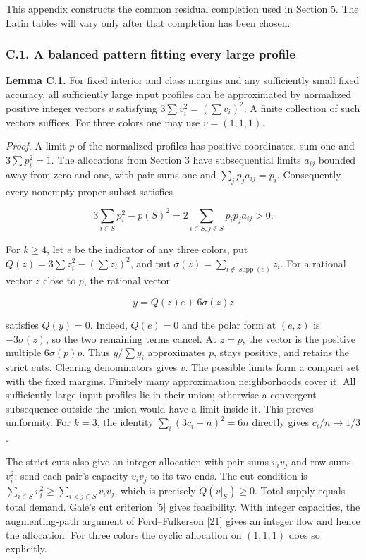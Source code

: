 \documentclass[english,11pt,a4paper]{article}
\newcounter{none}
\begin{document}
This appendix constructs the common residual completion used in Section 5. The Latin tables will vary only after that completion has been chosen.

\subsubsection{C.1. A balanced pattern fitting every large profile}\label{c.1.-a-balanced-pattern-fitting-every-large-profile}

\textbf{Lemma C.1.} For fixed interior and class margins and any sufficiently small fixed accuracy, all sufficiently large input profiles can be approximated by normalized positive integer vectors \(v\) satisfying \(3\sum v_i^2=(\sum v_i)^2\). A finite collection of such vectors suffices. For three colors one may use \(v=(1,1,1)\).

\emph{Proof.} A limit \(p\) of the normalized profiles has positive coordinates, sum one and \(3\sum p_i^2=1\). The allocations from Section 3 have subsequential limits \(a_{ij}\) bounded away from zero and one, with pair sums one and \(\sum_jp_ja_{ij}=p_i\). Consequently every nonempty proper subset satisfies

\[3\sum_{i\in S}p_i^2-p(S)^2=2\sum_{i\in S,j\notin S}p_ip_ja_{ij}>0.\]

For \(k\ge4\), let \(e\) be the indicator of any three colors, put \(Q(z)=3\sum z_i^2-(\sum z_i)^2\), and put \(\sigma(z)=\sum_{i\notin\operatorname{supp}(e)}z_i\). For a rational vector \(z\) close to \(p\), the rational vector

\[y=Q(z)e+6\sigma(z)z\]

satisfies \(Q(y)=0\). Indeed, \(Q(e)=0\) and the polar form at \((e,z)\) is \(-3\sigma(z)\), so the two remaining terms cancel. At \(z=p\), the vector is the positive multiple \(6\sigma(p)p\). Thus \(y/\sum y_i\) approximates \(p\), stays positive, and retains the strict cuts. Clearing denominators gives \(v\). The possible limits form a compact set with the fixed margins. Finitely many approximation neighborhoods cover it. All sufficiently large input profiles lie in their union; otherwise a convergent subsequence outside the union would have a limit inside it. This proves uniformity. For \(k=3\), the identity \(\sum_i(3c_i-n)^2=6n\) directly gives \(c_i/n\to1/3\).

The strict cuts also give an integer allocation with pair sums \(v_iv_j\) and row sums \(v_i^2\): send each pair's capacity \(v_iv_j\) to its two ends. The cut condition is \(\sum_{i\in S}v_i^2\ge\sum_{i<j\in S}v_iv_j\), which is precisely \(Q(v|_S)\ge0\). Total supply equals total demand. Gale's cut criterion {[}5{]} gives feasibility. With integer capacities, the augmenting-path argument of Ford--Fulkerson {[}21{]} gives an integer flow and hence the allocation. For three colors the cyclic allocation on \((1,1,1)\) does so explicitly.
\end{document}
